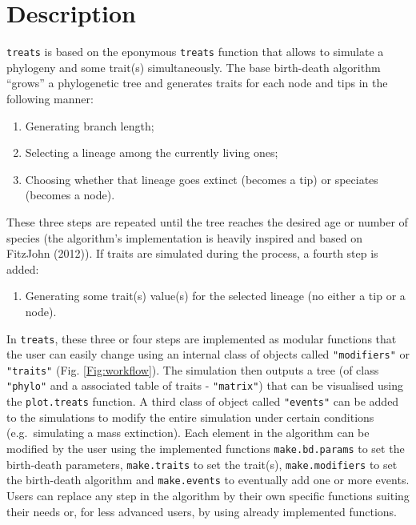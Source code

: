 \documentclass[
]{article}
\providecommand{\tightlist}{%
  \setlength{\itemsep}{0pt}\setlength{\parskip}{0pt}}
\begin{document}
\hypertarget{description}{%
\section{Description}\label{description}}

\texttt{treats} is based on the eponymous \texttt{treats} function that
allows to simulate a phylogeny and some trait(s) simultaneously. The
base birth-death algorithm ``grows'' a phylogenetic tree and generates
traits for each node and tips in the following manner:

\begin{enumerate}
\def\labelenumi{\arabic{enumi}.}
\tightlist
\item
  Generating branch length;
\item
  Selecting a lineage among the currently living ones;
\item
  Choosing whether that lineage goes extinct (becomes a tip) or
  speciates (becomes a node).
\end{enumerate}

These three steps are repeated until the tree reaches the desired age or
number of species (the algorithm's implementation is heavily inspired
and based on FitzJohn (2012)). If traits are simulated during the
process, a fourth step is added:

\begin{enumerate}
\def\labelenumi{\arabic{enumi}.}
\setcounter{enumi}{3}
\tightlist
\item
  Generating some trait(s) value(s) for the selected lineage (no either
  a tip or a node).
\end{enumerate}

In \texttt{treats}, these three or four steps are implemented as modular
functions that the user can easily change using an internal class of
objects called \texttt{"modifiers"} or \texttt{"traits"} (Fig.
\ref{Fig:workflow}). The simulation then outputs a tree (of class
\texttt{"phylo"} and a associated table of traits - \texttt{"matrix"})
that can be visualised using the \texttt{plot.treats} function. A third
class of object called \texttt{"events"} can be added to the simulations
to modify the entire simulation under certain conditions
(e.g.~simulating a mass extinction). Each element in the algorithm can
be modified by the user using the implemented functions
\texttt{make.bd.params} to set the birth-death parameters,
\texttt{make.traits} to set the trait(s), \texttt{make.modifiers} to set
the birth-death algorithm and \texttt{make.events} to eventually add one
or more events. Users can replace any step in the algorithm by their own
specific functions suiting their needs or, for less advanced users, by
using already implemented functions.
\end{document}
